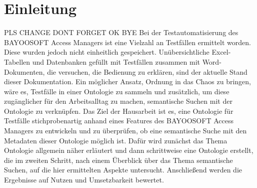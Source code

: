 \chapter{Einleitung}
PLS CHANGE DONT FORGET OK BYE Bei der Testautomatisierung des BAYOOSOFT Access Managers ist eine Vielzahl an Testfällen ermittelt worden. Diese wurden jedoch nicht einheitlich gespeichert. Unübersichtliche Excel-Tabellen und Datenbanken gefüllt mit Testfällen zusammen mit Word-Dokumenten, die versuchen, die Bedienung zu erklären, sind der aktuelle Stand dieser Dokumentation. Ein möglicher Ansatz, Ordnung in das Chaos zu bringen, wäre es, Testfälle in einer Ontologie zu sammeln und zusätzlich, um diese zugänglicher für den Arbeitsalltag zu machen, semantische Suchen mit der Ontologie zu verknüpfen. Das Ziel der Hausarbeit ist es, eine Ontologie für Testfälle stichprobenartig anhand eines Features des BAYOOSOFT Access Managers zu entwickeln und zu überprüfen, ob eine semantische Suche mit den Metadaten dieser Ontologie möglich ist. Dafür wird zunächst das Thema Ontologie allgemein näher erläutert und dann schrittweise eine Ontologie erstellt, die im zweiten Schritt, nach einem Überblick über das Thema semantische Suchen, auf die hier ermittelten Aspekte untersucht. Anschließend werden die Ergebnisse auf Nutzen und Umsetzbarkeit bewertet.